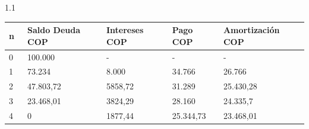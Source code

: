 	      
	      \begin{spacing}{1.1}
		      \begin{center}
			      \begin{tabular}{|p{1cm}|p{2cm}|p{2.1cm}|p{2cm}|p{2.5cm}|}
				      \hline
				      \rowcolor[HTML]{FFB183}
				      \textbf{n\ } & \textbf{Saldo Deuda COP} & \textbf{Intereses COP } & \textbf{Pago COP } & \textbf{Amortización COP} \\ \hline
				      
				      0            &   100.000         & -    & -  & -    \\ \hline
				      1            &   73.234           &   8.000          &   34.766      &   26.766             \\ \hline
				      2            &   47.803,72           &   5858,72             &   31.289      &   25.430,28             \\ \hline
				      3            &   23.468,01           &   3824,29             &   28.160      &   24.335,7            \\ \hline
				      4            &   0               &   1877,44             &   25.344,73      &   23.468,01             \\ \hline
			      \end{tabular}
		      \end{center}
	      \end{spacing}
